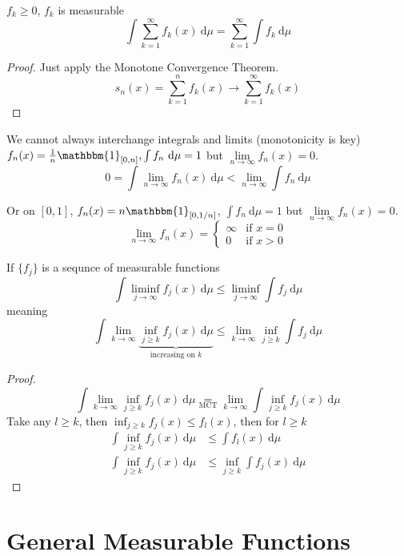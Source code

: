 \begin{lemma}
$f_k \ge 0$, $f_k$ is measurable
$$\int \sum_{k=1}^\infty f_k(x)\ \mathrm{d}\mu = \sum_{k=1}^\infty\int f_k \ \mathrm{d}\mu$$
\end{lemma}

\begin{proof}
  Just apply the Monotone Convergence Theorem.
  \[s_n(x) = \sum_{k=1}^n f_k(x) \to \sum_{k=1}^\infty f_k(x)\]
\end{proof}

\begin{remark}
We cannot always interchange integrals and limits (monotonicity is key)
$f_n(x) = \frac1n\mathbbm{1}_{[0, n]}, \int f_n\ \mathrm{d}\mu = 1$ 
but $\lim\limits_{n\to\infty}f_n(x) = 0$.
\[0 = \int \lim_{n\to \infty} f_n(x)\ \mathrm{d}\mu < \lim_{n\to\infty}\int f_n\ \mathrm{d}\mu\]

Or on $[0, 1]$, $f_n(x) = n\mathbbm{1}_{[0, 1/n]}$, $\int f_n\ \mathrm{d}\mu = 1$ but $\lim\limits_{n\to\infty}f_n(x) = 0$. 
$$\lim\limits_{n\to\infty}f_n(x) = \begin{cases}
  \infty & \text{if } x = 0 \\ 
  0 & \text{if } x > 0
\end{cases}$$
\end{remark}
  
\begin{lemma}
  If $\{f_j\}$ is a sequnce of measurable functions
  \[\int\liminf_{j\to\infty}f_j(x)\ \mathrm{d}\mu \le \liminf_{j\to\infty}\int f_j \ \mathrm{d}\mu\] 
  meaning 
  \[\int\lim_{k\to\infty} \underbrace{\inf_{j\ge k}f_j(x)\ \mathrm{d}\mu}_{\text{increasing on }k} \le \lim_{k\to\infty}\inf_{j\ge k}\int f_j \ \mathrm{d}\mu\] 
\end{lemma}
\begin{proof}
  \[\int\lim_{k\to\infty} \inf_{j\ge k}f_j(x)\ \mathrm{d}\mu \underset{\text{MCT}}= \lim_{k \to \infty} \int \inf_{j \ge k}f_j(x) \ \mathrm{d}\mu \]
  Take any $l \ge k$, then $\inf_{j \ge k}f_j(x) \le f_l(x)$, then for $l \ge k$
  \begin{align*}
    \int\inf_{j\ge k}f_j(x)\ \mathrm{d}\mu &\le \int f_l(x)\ \mathrm{d}\mu \\
    \int \inf_{j\ge k}f_j(x)\ \mathrm{d}\mu &\le \inf_{j\ge k}\int f_j(x)\ \mathrm{d}\mu
  \end{align*}
\end{proof}

\section{General Measurable Functions}

